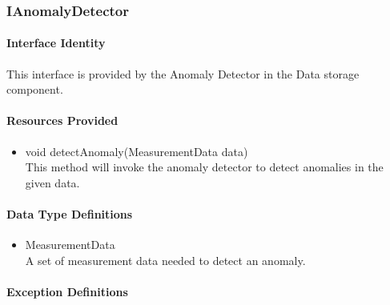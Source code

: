 \subsubsection{IAnomalyDetector}
\paragraph{Interface Identity}
This interface is provided by the Anomaly Detector in the Data storage component.
\paragraph{Resources Provided}
\begin{itemize}
	\item{void detectAnomaly(MeasurementData data)}\\
	This method will invoke the anomaly detector to detect anomalies
		in the given data.
\end{itemize}
\paragraph{Data Type Definitions}
\begin{itemize}
	\item MeasurementData\\
	A set of measurement data needed to detect an anomaly.
\end{itemize}
\paragraph{Exception Definitions}
